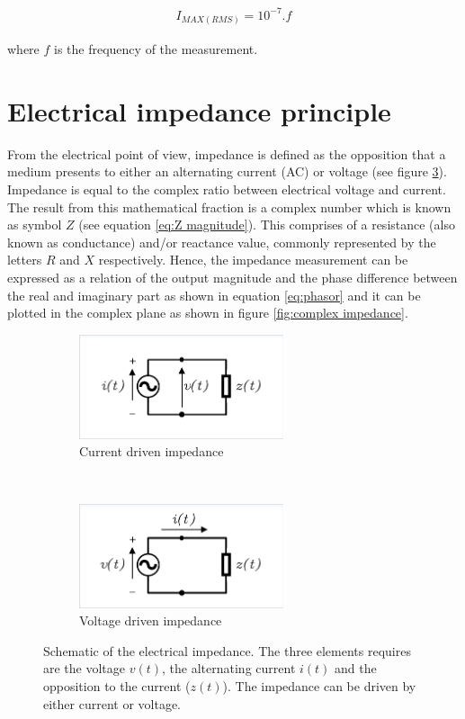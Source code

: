 \begin{align}
	\label{eq:current body}
	I_{MAX(RMS)} = 10^{-7}.f
\end{align}

where $f$ is the frequency of the measurement.

\section{Electrical impedance principle}
\label{section impedance principle}
From the electrical point of view, impedance is defined as the opposition that a medium presents to either an alternating current (AC) or voltage (see figure \ref{fig:impedance}). Impedance is equal to the complex ratio between electrical voltage and current. The result from this mathematical fraction is a complex number which is known as symbol $Z$ (see equation \ref{eq:Z magnitude}). This comprises of a resistance (also known as conductance) and/or reactance value, commonly represented by the letters $R$ and $X$ respectively. Hence, the impedance measurement can be expressed as a relation of the output magnitude and the phase difference between the real and imaginary part as shown in equation \ref{eq:phasor} and it can be plotted in the complex plane as shown in figure \ref{fig:complex impedance}.

\begin{figure}[!htpb]
	\centering
	\begin{subfigure}[t]{0.4\textwidth}
		\centering
		\includegraphics[width=6cm,trim={0.05cm 0.05cm 0.05cm 0.15cm},clip,keepaspectratio]{figure0a}    
		\caption{Current driven impedance}
		\label{fig:impedance a}
	\end{subfigure}
	~
	\begin{subfigure}[t]{0.4\textwidth}
		\centering
		\includegraphics[width=6cm,trim={0.05cm 0.05cm 0.05cm 0.15cm},clip,keepaspectratio]{figure0b}    
		\caption{Voltage driven impedance}
		\label{fig:impedance b}
	\end{subfigure}
	\caption[Impedance representation from two-terminal element]{Schematic of the electrical impedance. The three elements requires are the voltage $v(t)$, the alternating current $i(t)$ and the opposition to the current ($z(t)$). The impedance can be driven by either current or voltage.}
	\label{fig:impedance}
\end{figure}

